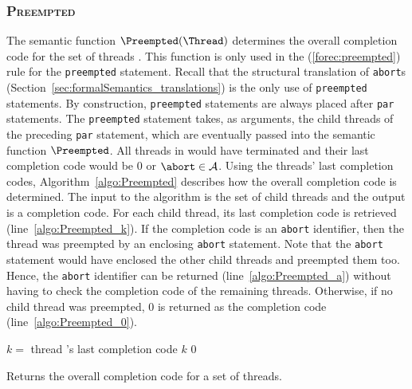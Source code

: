\subsubsection{\textsc{Preempted}}
\label{sec:forec_Preempted}
The semantic function $\Preempted(\Thread)$ determines the 
overall completion code for the set of threads \Thread{}. 
This function is only used in the (\ref{forec:preempted}) 
rule for the \verb$preempted$ statement. Recall that the 
structural translation of \verb$abort$s (Section~\ref{sec:formalSemantics_translations})
is the only use of \verb$preempted$ statements.
By construction, \verb$preempted$ statements are always
placed after \verb$par$ statements. The \verb$preempted$ 
statement takes, as arguments, the child threads of the 
preceding \verb$par$ statement, which are eventually passed 
into the semantic function $\Preempted$. All threads in 
\Thread{} would have terminated and their last completion code 
would be $0$ or $\abort \in \mathcal{A}$. Using the threads' 
last completion codes, Algorithm~\ref{algo:Preempted} describes
how the overall completion code is determined. The input 
to the algorithm is the set of child threads \Thread{} and
the output is a completion code. For each child thread, its
last completion code is retrieved (line~\ref{algo:Preempted_k}).
If the completion code is an \verb$abort$ identifier, then 
the thread was preempted by an enclosing \verb$abort$ statement.
Note that the \verb$abort$ statement would have enclosed the other 
child threads and preempted them too. Hence, the \verb$abort$ 
identifier can be returned (line~\ref{algo:Preempted_a}) without 
having to check the completion code of the remaining threads. 
Otherwise, if no child thread was preempted, $0$ is returned as 
the completion code (line~\ref{algo:Preempted_0}).

\begin{algorithm}[t]
	\begin{algorithmic}[1]
		\Function{$\Preempted$}{\Thread{}}
			\ForAll {$\thread \in \Thread$}
				\State $k =$ thread \thread's last completion code	\label{algo:Preempted_k}
					\State \Return $k$								\label{algo:Preempted_a}
				\EndIf
			\EndFor
			\State \Return $0$										\label{algo:Preempted_0}
		\EndFunction
	\end{algorithmic}
	
	\caption{Returns the overall completion code for a set of threads.}
	\label{algo:Preempted}
\end{algorithm}

